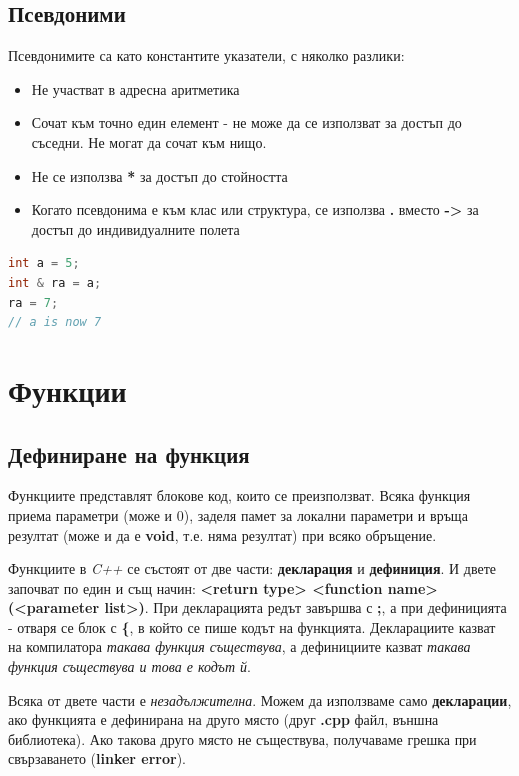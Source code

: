 \documentclass[fleqn,12pt]{article}
\begin{document}
\subsection{Псевдоними}
\label{references}
Псевдонимите са като константите указатели, с няколко разлики:
\begin{itemize}
    \item Не участват в адресна аритметика
    \item Сочат към точно един елемент - не може да се използват за достъп до съседни. Не могат да сочат към нищо.
    \item Не се използва \textbf{*} за достъп до стойността
    \item Когато псевдонима е към клас или структура, се използва \textbf{.} вместо \textbf{->} за достъп до индивидуалните полета
\end{itemize}

\begin{lstlisting}[language=C++, caption=Pointer example 2]
int a = 5;
int & ra = a;
ra = 7;
// a is now 7
\end{lstlisting}

\section{Функции}
\subsection{Дефиниране на функция}
Функциите представлят блокове код, които се преизползват. Всяка функция приема параметри (може и 0),
заделя памет за локални параметри и връща резултат (може и да е \textbf{void}, т.е. няма резултат)
при всяко обръщение.

Функциите в \textit{C++} се състоят от две части: \textbf{декларация} и \textbf{дефиниция}.
И двете започват по един и същ начин: \textbf{<return type> <function name>(<parameter list>)}.
При декларацията редът завършва с \textbf{;}, а при дефиницията - отваря се блок с \textbf{\{}, 
в който се пише кодът на функцията. Декларациите казват на компилатора \textit{такава функция съществува},
а дефинициите казват \textit{такава функция съществува и това е кодът й}.

Всяка от двете части е \textit{незадължителна}. Можем да използваме само \textbf{декларации}, ако функцията е 
дефинирана на друго място (друг \textbf{.cpp} файл, външна библиотека). Ако такова друго място не съществува, 
получаваме грешка при свързаването (\textbf{linker error}).
\end{document}
